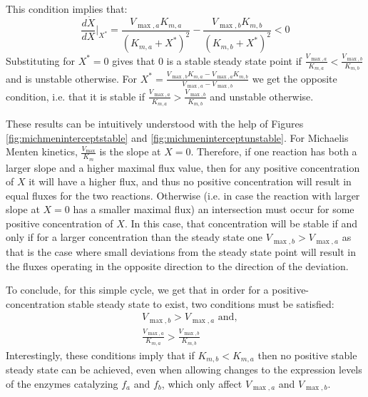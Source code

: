 \documentclass[a4page,notitlepage]{article}
\begin{document}
    This condition implies that:
    \begin{equation*}
      \frac{d\dot X}{dX}\Big\vert_{X^*} = \frac{V_{\max,a}K_{m,a}}{(K_{m,a}+X^*)^2}-\frac{V_{\max,b}K_{m,b}}{(K_{m,b}+X^*)^2}<0
    \end{equation*}
    Substituting for $X^*=0$ gives that $0$ is a stable steady state point if $\frac{V_{\max,a}}{K_{m,a}}<\frac{V_{\max,b}}{K_{m,b}}$ and is unstable otherwise.
    For $X^*=\frac{V_{\max,b}K_{m,a}-V_{\max,a}K_{m,b}}{V_{\max,a}-V_{\max,b}}$ we get the opposite condition, i.e. that it is stable if $\frac{V_{\max,a}}{K_{m,a}}>\frac{V_{\max,b}}{K_{m,b}}$ and unstable otherwise.
    
    These results can be intuitively understood with the help of Figures \ref{fig:michmeninterceptstable} and \ref{fig:michmeninterceptunstable}.
    For Michaelis Menten kinetics, $\frac{V_{\max}}{K_m}$ is the slope at $X=0$.
    Therefore, if one reaction has both a larger slope and a higher maximal flux value, then for any positive concentration of $X$ it will have a higher flux, and thus no positive concentration will result in equal fluxes for the two reactions.
    Otherwise (i.e. in case the reaction with larger slope at $X=0$ has a smaller maximal flux) an intersection must occur for some positive concentration of $X$.
    In this case, that concentration will be stable if and only if for a larger concentration than the steady state one $V_{\max,b}>V_{\max,a}$ as that is the case where small deviations from the steady state point will result in the fluxes operating in the opposite direction to the direction of the deviation.

    To conclude, for this simple cycle, we get that in order for a positive-concentration stable steady state to exist, two conditions must be satisfied:
    $$
    \begin{aligned}
      & V_{\max,b}>V_{\max,a} \text{ and,}\\
      & \frac{V_{\max,a}}{K_{m,a}}>\frac{V_{\max,b}}{K_{m,b}}
    \end{aligned}
    $$
    Interestingly, these conditions imply that if $K_{m,b}<K_{m,a}$ then no positive stable steady state can be achieved, even when allowing changes to the expression levels of the enzymes catalyzing $f_a$ and $f_b$, which only affect $V_{\max,a}$ and $V_{\max,b}$.
    
\end{document}
